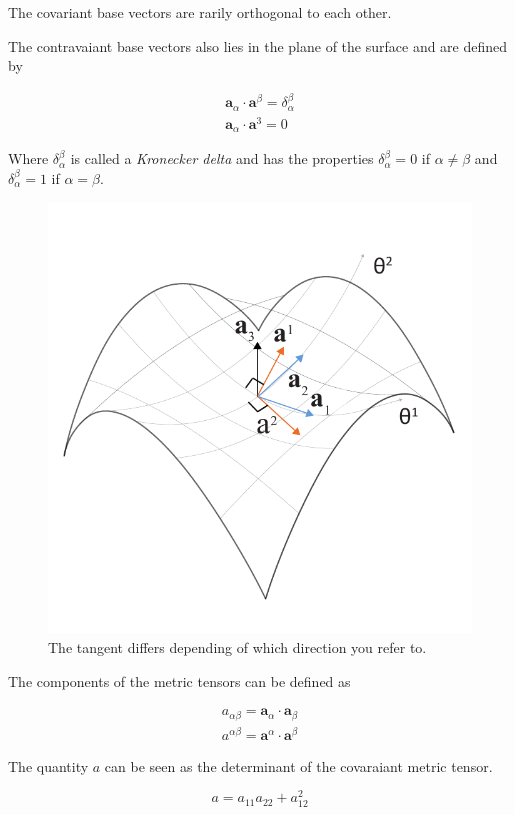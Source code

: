 The covariant base vectors are rarily orthogonal to each other.

The contravaiant base vectors also lies in the plane of the surface and are defined by

\begin{align}
\textbf{a}_{\alpha} \cdot \textbf{a}^\beta = \delta^{\beta}_\alpha \\
\textbf{a}_{\alpha} \cdot \textbf{a}^3 = 0    
\end{align}

Where $\delta^{\beta}_\alpha$ is called a \textit{Kronecker delta} and has the properties $\delta^{\beta}_\alpha = 0$ if $\alpha \neq  \beta$ and $\delta^{\beta}_\alpha = 1$ if $\alpha =  \beta$. 
 
\begin{figure}[H]
\centering
\includegraphics[width=0.7\linewidth ]{figure/Theory/surfGeometry2.pdf}
\caption{The tangent differs depending of which direction you refer to. }
\end{figure}
 
The components of the metric tensors can be defined as

\begin{align} \label{metricComp}
a_{\alpha \beta} = \textbf{a}_\alpha \cdot \textbf{a}_\beta \\
a^{\alpha \beta} = \textbf{a}^\alpha \cdot \textbf{a}^\beta 
\end{align}

The quantity $a$ can be seen as the determinant of the covaraiant metric tensor.

\begin{equation}
a = a_{11} a_{22} + a_{12}^2
\end{equation}



